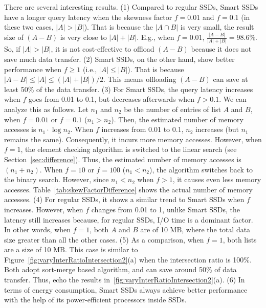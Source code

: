There are several interesting results.
(1) Compared to regular SSDs, Smart SSDs have a longer query latency when the skewness factor $f=0.01$ and $f=0.1$ (in these two cases, $|A| > |B|$). That is because the $|A\cap B|$ is very small, the result size of $(A-B)$ is very close to $|A| + |B|$. E.g., when $f=0.01$, $\frac{|A-B|}{|A| + |B|}=98.6\%$. So, if $|A| > |B|$, it is not cost-effective to offload $(A-B)$ because it does not save much data transfer.
(2) Smart SSDs, on the other hand, show better performance when $f\ge 1$ (i.e., $|A| \le |B|$). That is because $|A-B| \le |A| \le (|A| + |B|)/2$. This means offloading $(A-B)$ can save at least 50\% of the data transfer.
(3) For Smart SSDs, the query latency increases when $f$ goes from 0.01 to 0.1, but decreases afterwards when $f>0.1$.
We can analyze this as follows. Let $n_1$ and $n_2$ be the number of entries of list $A$ and $B$, when $f=0.01$ or $f=0.1$ ($n_1>n_2$). Then, the estimated number of memory accesses is $n_1\cdot\log n_2$. When $f$ increases from 0.01 to 0.1, $n_2$ increases (but $n_1$ remains the same). Consequently, it incurs more memory accesses. However, when $f=1$, the element checking algorithm is switched to the linear search (see Section~\ref{sec:difference}). Thus, the estimated number of memory accesses is $(n_1 + n_2)$. When $f=10$ or $f=100$ ($n_1<n_2$), the algorithm switches back to the binary search. However, since $n_1<n_2$ when $f>1$, it causes even less memory accesses. Table~\ref{tab:skewFactorDifference} shows the actual number of memory accesses.
(4) For regular SSDs, it shows a similar trend to Smart SSDs when $f$ increases. However, when $f$ changes from 0.01 to 1, unlike Smart SSDs, the latency still increases because, for regular SSDs, I/O time is a dominant factor. In other words, when $f=1$, both $A$ and $B$ are of 10 MB, where the total data size greater than all the other cases.
(5) As a comparison, when $f=1$, both lists are a size of 10 MB. This case is similar to Figure~\ref{fig:varyInterRatioIntersection2}(a) when the intersection ratio is 100\%. Both adopt sort-merge based algorithm, and can save around 50\% of data transfer. Thus, echo the results in~\ref{fig:varyInterRatioIntersection2}(a).
(6) In terms of energy consumption, Smart SSDs always achieve better performance with the help of its power-efficient processors inside SSDs.

